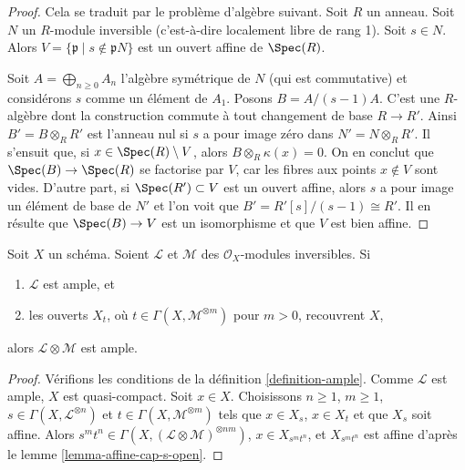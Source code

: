 \begin{proof}
Cela se traduit par le problème d'algèbre suivant.
Soit $R$ un anneau. Soit $N$ un $R$-module inversible
(c'est-à-dire localement libre de rang 1). Soit $s \in N$.
Alors $V = \{\mathfrak p \mid s \not \in \mathfrak p N\}$ est
un ouvert affine de $\Spec(R)$.

\medskip\noindent
Soit $A = \bigoplus_{n \geq 0} A_n$ l'algèbre symétrique de $N$
(qui est commutative) et considérons $s$ comme un élément de $A_1$.
Posons $B = A/(s - 1)A$. C'est une $R$-algèbre dont la construction
commute à tout changement de base $R \to R'$. Ainsi $B' = B \otimes_R R'$
est l'anneau nul si $s$ a pour image zéro dans $N' = N \otimes_R R'$.
Il s'ensuit que, si $x \in \Spec(R) \setminus V$, alors $B \otimes_R \kappa(x) = 0$.
On en conclut que $\Spec(B) \to \Spec(R)$ se factorise par $V$, car les
fibres aux points $x \not \in V$ sont vides. D'autre part, si
$\Spec(R') \subset V$ est un ouvert affine, alors $s$ a pour image un élément
de base de $N'$ et l'on voit que $B' = R'[s]/(s - 1) \cong R'$.
Il en résulte que $\Spec(B) \to V$ est un isomorphisme et que $V$ est
bien affine.
\end{proof}

\begin{lemma}
\label{lemma-ample-tensor-globally-generated}
\begin{reference}
\cite[II Proposition 4.5.6(ii)]{EGA}
\end{reference}
Soit $X$ un schéma. Soient $\mathcal{L}$ et $\mathcal{M}$
des $\mathcal{O}_X$-modules inversibles. Si
\begin{enumerate}
\item $\mathcal{L}$ est ample, et
\item les ouverts $X_t$, où $t \in \Gamma(X, \mathcal{M}^{\otimes m})$
pour $m > 0$, recouvrent $X$,
\end{enumerate}
alors $\mathcal{L} \otimes \mathcal{M}$ est ample.
\end{lemma}

\begin{proof}
Vérifions les conditions de la définition \ref{definition-ample}.
Comme $\mathcal{L}$ est ample, $X$ est quasi-compact.
Soit $x \in X$. Choisissons $n \geq 1$, $m \geq 1$,
$s \in \Gamma(X, \mathcal{L}^{\otimes n})$ et
$t \in \Gamma(X, \mathcal{M}^{\otimes m})$
tels que $x \in X_s$, $x \in X_t$ et que $X_s$ soit affine.
Alors $s^mt^n \in \Gamma(X, (\mathcal{L} \otimes \mathcal{M})^{\otimes nm})$,
$x \in X_{s^mt^n}$, et $X_{s^mt^n}$ est affine d'après
le lemme \ref{lemma-affine-cap-s-open}.
\end{proof}

